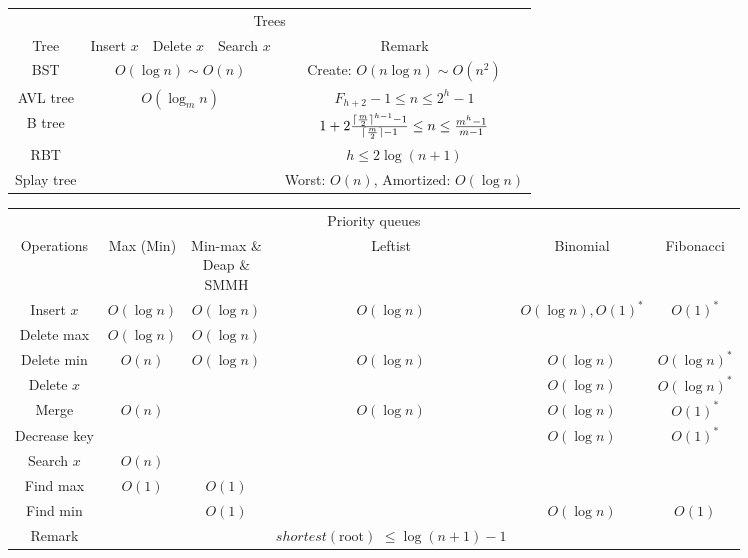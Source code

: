 \begin{table}[H]
    \centering
    \begin{tabular}{|c|c|c|c|c|}
        \hline
        \multicolumn{5}{|c|}{Trees} \\
        \Xhline{3\arrayrulewidth}
        Tree & Insert $x$ & Delete $x$ & Search $x$ & Remark \\
        \Xhline{2\arrayrulewidth}
        BST & \multicolumn{3}{c|}{$O(\log n) \sim O(n)$} & Create: $O(n\log n) \sim O(n^2)$ \\
        \hline
        AVL tree & \multicolumn{3}{c|}{\multirow{4}{*}{$O(\log_m n)$}} & $F_{h + 2} - 1 \le n \le 2^h - 1$ \\
        \cline{1-1}\cline{5-5}
        B tree & \multicolumn{3}{c|}{} & $1 + 2\frac{\lceil\frac{m}{2}\rceil^{h - 1} - 1}{\lceil\frac{m}{2}\rceil - 1} \le n \le \frac{m^h - 1}{m - 1}$ \\
        \cline{1-1}\cline{5-5}
        RBT & \multicolumn{3}{c|}{} & $h \le 2\log (n + 1)$ \\
        \cline{1-1}\cline{5-5}
        Splay tree & \multicolumn{3}{c|}{} & Worst: $O(n)$, Amortized: $O(\log n)$ \\
        \hline
    \end{tabular}
\end{table}

\begin{table}[H]
    \centering
    \begin{tabular}{|c|c|c|c|c|c|}
        \hline
        \multicolumn{6}{|c|}{Priority queues} \\
        \Xhline{3\arrayrulewidth}
        Operations & Max (Min) & \makecell{Min-max \&\\Deap \&\\SMMH} & Leftist & Binomial & Fibonacci \\
        \Xhline{2\arrayrulewidth}
        Insert $x$ & $O(\log n)$ & $O(\log n)$ & $O(\log n)$ & $O(\log n), O(1)^*$ & $O(1)^*$ \\
        \hline
        Delete max & $O(\log n)$ & $O(\log n)$ & & & \\
        \hline
        Delete min & $O(n)$ & $O(\log n)$ & $O(\log n)$ & $O(\log n)$ & $O(\log n)^*$ \\
        \hline
        Delete $x$ & & & & $O(\log n)$ & $O(\log n)^*$ \\
        \hline
        Merge & $O(n)$ & & $O(\log n)$ & $O(\log n)$ & $O(1)^*$ \\
        \hline
        Decrease key & & & & $O(\log n)$ & $O(1)^*$ \\
        \hline
        Search $x$ & $O(n)$ & & & & \\
        \hline
        Find max & $O(1)$ & $O(1)$ & & & \\
        \hline
        Find min & & $O(1)$ & & $O(\log n)$ & $O(1)$ \\
        \hline
        Remark & & & \makecell{$shortest(\text{root})$\\$\le \log (n + 1) - 1$} & & \\
        \hline
    \end{tabular}
\end{table}

